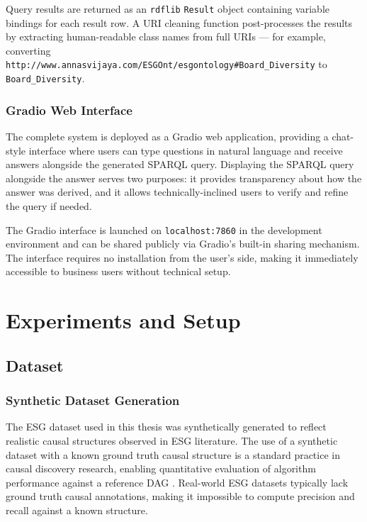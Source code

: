 \documentclass[a4paper,11pt,oneside]{article}
\begin{document}
Query results are returned as an \texttt{rdflib} \texttt{Result} object containing variable bindings for each result row. A URI cleaning function post-processes the results by extracting human-readable class names from full URIs — for example, converting \texttt{http://www.annasvijaya.com/ESGOnt/esgontology\#Board\_Diversity} to \texttt{Board\_Diversity}.

\subsubsection{Gradio Web Interface}

The complete system is deployed as a Gradio web application, providing a chat-style interface where users can type questions in natural language and receive answers alongside the generated SPARQL query. Displaying the SPARQL query alongside the answer serves two purposes: it provides transparency about how the answer was derived, and it allows technically-inclined users to verify and refine the query if needed.

The Gradio interface is launched on \texttt{localhost:7860} in the development environment and can be shared publicly via Gradio's built-in sharing mechanism. The interface requires no installation from the user's side, making it immediately accessible to business users without technical setup.

\section{Experiments and Setup}

\subsection{Dataset}

\subsubsection{Synthetic Dataset Generation}

The ESG dataset used in this thesis was synthetically generated to reflect realistic causal structures observed in ESG literature. The use of a synthetic dataset with a known ground truth causal structure is a standard practice in causal discovery research, enabling quantitative evaluation of algorithm performance against a reference DAG \cite{spirtes2000}. Real-world ESG datasets typically lack ground truth causal annotations, making it impossible to compute precision and recall against a known structure.
\end{document}
